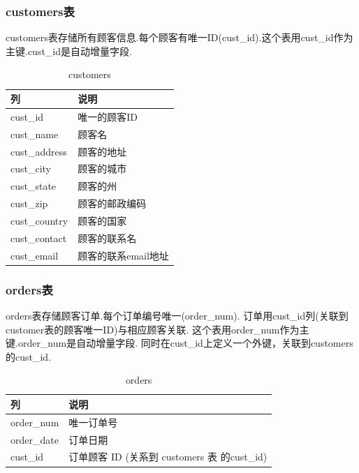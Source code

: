 \subsubsection{customers表}
customers表存储所有顾客信息.每个顾客有唯一ID(cust\_id).这个表用cust\_id作为主键.cust\_id是自动增量字段.

\begin{table}[H]
  \caption{customers}
  \begin{center}
    \begin{tabular}[c]{|l|l|}
      \hline
      列 & 说明 \\
      \hline
      cust\_id & 唯一的顾客ID \\
      \hline
      cust\_name & 顾客名 \\
      \hline
      cust\_address & 顾客的地址 \\
      \hline
      cust\_city & 顾客的城市 \\
      \hline
      cust\_state & 顾客的州 \\
      \hline
      cust\_zip & 顾客的邮政编码 \\
      \hline
      cust\_country & 顾客的国家 \\
      \hline
      cust\_contact & 顾客的联系名 \\
      \hline
      cust\_email & 顾客的联系email地址 \\
      \hline
    \end{tabular}
  \end{center}
\end{table}

\subsubsection{orders表}
orders表存储顾客订单.每个订单编号唯一(order\_num).
订单用cust\_id列(关联到customer表的顾客唯一ID)与相应顾客关联.
这个表用order\_num作为主键.order\_num是自动增量字段.
同时在cust\_id上定义一个外键，关联到customers的cust\_id.

\begin{table}[H]
  \caption{orders}
  \begin{center}
    \begin{tabular}[c]{|l|l|}
      \hline
      列 & 说明 \\
      \hline
      order\_num & 唯一订单号 \\
      \hline
      order\_date & 订单日期 \\
      \hline
      cust\_id & 订单顾客 ID (关系到 customers 表 的cust\_id) \\
      \hline
    \end{tabular}
  \end{center}
\end{table}

